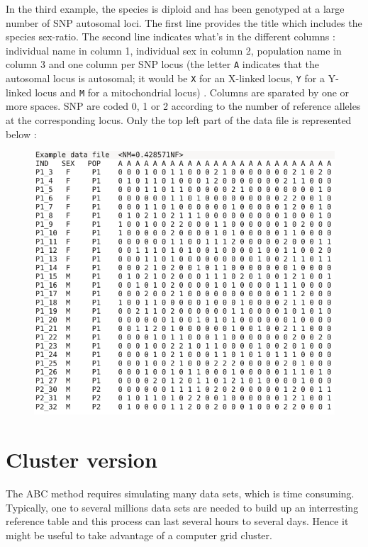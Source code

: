 In the third example, the species is diploid and has been genotyped at a large number of SNP autosomal loci. The first line provides the title which includes the species sex-ratio. The second line indicates what's in the different columns : individual name in column 1, individual sex in column 2, population name in column 3 and one column per SNP locus (the letter \texttt{A} indicates that the autosomal locus is autosomal; it would be \texttt{X} for an X-linked locus, \texttt{Y} for a Y-linked locus and \texttt{M} for a mitochondrial locus) . Columns are sparated by one or more spaces. SNP are coded 0, 1 or 2 according to the number of reference alleles at the corresponding locus. Only the top left part of the data file is represented below :

\begin{figure}[h]
\includegraphics[scale=0.5]{gui_pictures/screenga003.png}
\end{figure}



\clearpage
\section{Cluster version}\label{cluster}
The ABC method requires simulating many data sets, which is time consuming. Typically, one to several millions data sets are needed to build up an interresting reference table and this process can last several hours to several days. Hence it might be useful to take advantage of a computer grid cluster.

